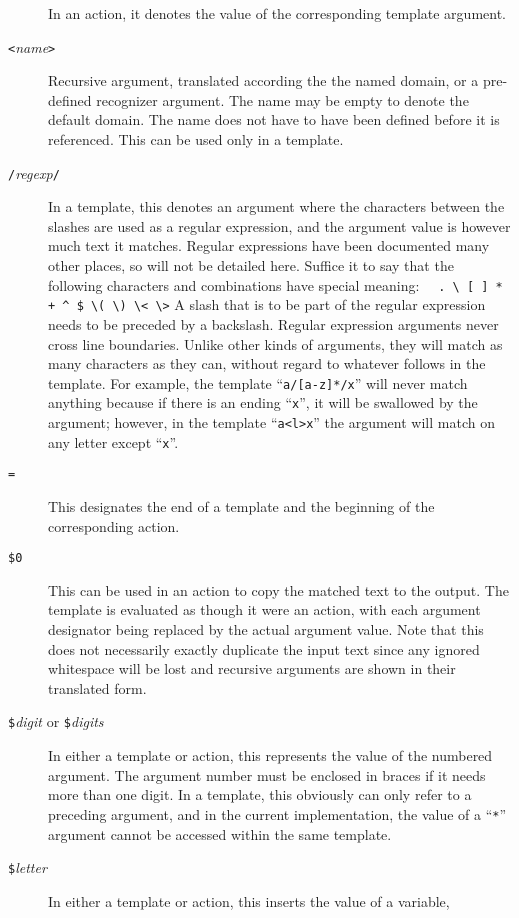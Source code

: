 \begin{description}
In an action, it denotes the value of the corresponding template argument.
\item[{\tt <}{\it name}{\tt >}]
Recursive argument, translated according the the named domain,
or a pre-defined recognizer argument.  The name may be empty to denote
the default domain.
The name does not have to have been defined before it is referenced.
This can be used only in a template.
\item[{\tt /}{\it regexp}{\tt /}]
In a template, this denotes an argument where
the characters between the slashes are used as a regular expression,
and the argument value is however much text it matches.
Regular expressions have been documented many other places, so will not
be detailed here.  Suffice it to say that the following characters and
combinations have special meaning:\newline
\verb|  . \ [ ] * + ^ $ \( \) \< \>|
\newline
A slash that is to be part of the regular expression needs to be
preceded by a backslash.
Regular expression arguments never cross line boundaries.
Unlike other kinds of arguments, they will match as many characters as
they can, without regard to whatever follows in the template.
For example, the template ``\verb|a/[a-z]*/x|'' will never match anything
because if there is an ending ``\verb/x/'', it will be swallowed by the
argument; however, in the template ``\verb|a<l>x|'' the argument will match
on any letter except ``\verb/x/''.
\item[{\tt =}]
This designates the end of a template and the beginning of the
corresponding action.
\item[{\tt \$0}]
This can be used in an action to copy the matched text to the output.
The template is evaluated as though it were an action, with each
argument designator being replaced by the actual argument value.
Note that this does not necessarily exactly duplicate the input text
since any ignored whitespace will be lost and recursive arguments are shown in
their translated form.
\item[{\tt \$}{\it digit} or {\tt \$\ttlb}{\it digits}{\tt \ttrb}]
In either a template or action, this represents the value of the
numbered argument.  The argument number must be enclosed in braces if it
needs more than one digit.  In a template, this obviously can only refer
to a preceding argument, and in the current implementation, the value of a
``\verb/*/'' argument cannot be accessed within the same template.
\item[{\tt \$}{\it letter}]
In either a template or action, this inserts the value of a variable,

\end{description}
